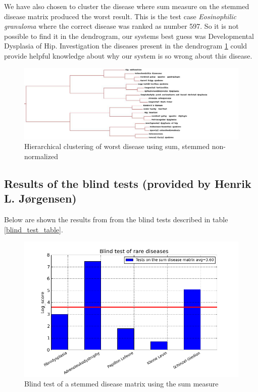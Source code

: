 We have also chosen to cluster the disease where sum measure on the stemmed 
disease matrix produced the worst result. This is the test case
\textit{Eosinophilic granuloma} where the correct disease was ranked as number
597. So it is not possible to find it in the dendrogram, our systems 
best guess was Developmental Dysplasia of Hip. Investigation the
diseases present in the dendrogram
\ref{sum_stem_top20_worst_developmental_dysplasia_of_hip} could
provide helpful knowledge about why our system is so wrong about this
disease.

\begin{figure}[H]
  \begin{center}
    \includegraphics[width=1.3\textwidth]{clusters/sum_stem_top20_worst_developmental_dysplasia_of_hip.jpg}
  \end{center}
  \caption{Hierarchical clustering of worst disease using sum, stemmed non-normalized}
  \label{sum_stem_top20_worst_developmental_dysplasia_of_hip}
\end{figure}

\subsection{Results of the blind tests (provided by Henrik L. J\o rgensen)\label{Blindtest}}

Below are shown the results from from the blind tests described in table \ref{blind_test_table}.

\begin{figure}[H]
  \caption{Blind test of a stemmed disease matrix using the sum measure}
  \begin{center}
    \includegraphics[width=1\textwidth]{barcharts/blind_test.png}
  \end{center}
  \label{blind_test_barchart}
\end{figure}

